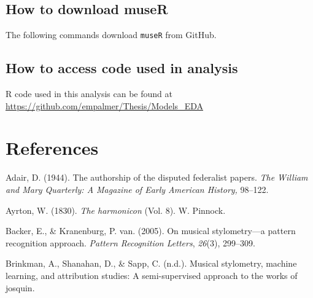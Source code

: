 \documentclass[12pt,twoside]{reedthesis}
\theoremstyle{definition}
\theoremstyle{definition}
\theoremstyle{definition}
\theoremstyle{remark}
\begin{document}
\section*{How to download museR}\label{how-to-download-muser}

The following commands download \texttt{museR} from GitHub.
\begin{Shaded}
\begin{Highlighting}[]
\NormalTok{(}\NormalTok{)}
\end{Highlighting}
\end{Shaded}
\section*{How to access code used in
analysis}\label{how-to-access-code-used-in-analysis}

R code used in this analysis can be found at
\url{https://github.com/empalmer/Thesis/Models_EDA}

\backmatter

\chapter*{References}\label{references}


\noindent

\setlength{\parindent}{-0.20in} \setlength{\leftskip}{0.20in}
\setlength{\parskip}{8pt}

\hypertarget{refs}{}
\hypertarget{ref-adair1944}{}
Adair, D. (1944). The authorship of the disputed federalist papers.
\emph{The William and Mary Quarterly: A Magazine of Early American
History,} 98--122.

\hypertarget{ref-harmonicon}{}
Ayrton, W. (1830). \emph{The harmonicon} (Vol. 8). W. Pinnock.

\hypertarget{ref-backer2005}{}
Backer, E., \& Kranenburg, P. van. (2005). On musical stylometry---a
pattern recognition approach. \emph{Pattern Recognition Letters},
\emph{26}(3), 299--309.

\hypertarget{ref-brinkman2016}{}
Brinkman, A., Shanahan, D., \& Sapp, C. (n.d.). Musical stylometry,
machine learning, and attribution studies: A semi-supervised approach to
the works of josquin.
\end{document}
